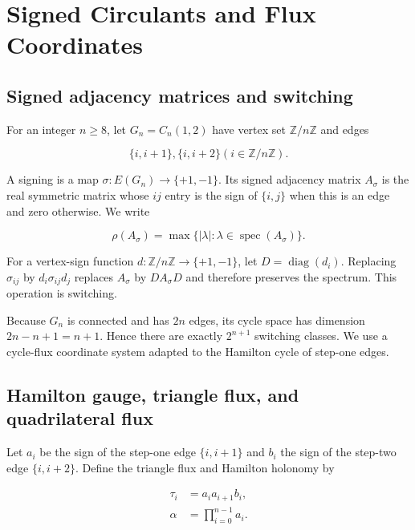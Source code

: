 \section{Signed Circulants and Flux Coordinates}\label{sec:preliminaries}

\subsection{Signed adjacency matrices and switching}

For an integer \(n\geq 8\), let \(G_n=C_n(1,2)\) have vertex set \(\mathbb{Z}/n\mathbb{Z}\) and edges

\begin{equation}
\{i,i+1\}, \{i,i+2\}    (i \in \mathbb{Z}/n\mathbb{Z}).
\end{equation}

A signing is a map \(\sigma:E(G_n)\to \{+1,-1\}\). Its signed adjacency matrix
\(A_\sigma\) is the real symmetric matrix whose \(ij\) entry is the sign of
\(\{i,j\}\) when this is an edge and zero otherwise. We write

\begin{equation}
\rho(A_\sigma)=\max\{\lvert \lambda\rvert: \lambda \in \operatorname{spec}(A_\sigma)\}.
\end{equation}

For a vertex-sign function \(d:\mathbb{Z}/n\mathbb{Z}\to \{+1,-1\}\), let \(D=\operatorname{diag}(d_i)\). Replacing
\(\sigma_{ij}\) by \(d_i \sigma_{ij} d_j\) replaces \(A_\sigma\) by \(D A_\sigma D\) and
therefore preserves the spectrum. This operation is switching.

Because \(G_n\) is connected and has \(2n\) edges, its cycle space has dimension
\(2n-n+1=n+1\). Hence there are exactly \(2^{n+1}\) switching classes. We use a
cycle-flux coordinate system adapted to the Hamilton cycle of step-one edges.

\subsection{Hamilton gauge, triangle flux, and quadrilateral flux}

Let \(a_i\) be the sign of the step-one edge \(\{i,i+1\}\) and \(b_i\) the sign of
the step-two edge \(\{i,i+2\}\). Define the triangle flux and Hamilton holonomy by

\begin{equation}
\begin{aligned}
\tau_i&=a_i a_{i+1} b_i, \\
\alpha&=\prod_{i=0}^{n-1} a_i.
\end{aligned}
\end{equation}

